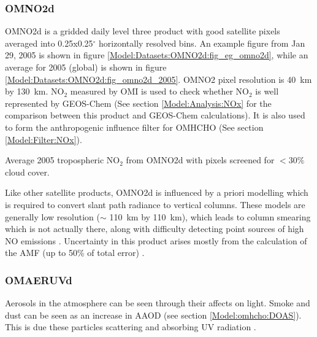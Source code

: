     \subsubsection{OMNO2d}
      \label{Model:Datasets:OMNO2d}
      OMNO2d is a gridded daily level three product with good satellite pixels averaged into 0.25x0.25$^{\circ}$ horizontally resolved bins.
      An example figure from Jan 29, 2005 is shown in figure \ref{Model:Datasets:OMNO2d:fig_eg_omno2d}, while an average for 2005 (global) is shown in figure \ref{Model:Datasets:OMNO2d:fig_omno2d_2005}.
      OMNO2 pixel resolution is 40~km by 130~km.
      NO$_2$ measured by OMI is used to check whether NO$_2$ is well represented by GEOS-Chem (See section \ref{Model:Analysis:NOx} for the comparison between this product and GEOS-Chem calculations).
      It is also used to form the anthropogenic influence filter for OMHCHO (See section \ref{Model:Filter:NOx}).
      
      
      
      {Average 2005 tropospheric NO$_2$ from OMNO2d with pixels screened for $<30\%$ cloud cover.}
      {\label{Model:Datasets:OMNO2d:fig_omno2d_2005}}
      
      Like other satellite products, OMNO2d is influenced by a priori modelling which is required to convert slant path radiance to vertical columns.
      These models are generally low resolution ($\sim$ 110~km by 110~km), which leads to column smearing which is not actually there, along with difficulty detecting point sources of high NO emissions \parencite{Goldberg2018}.
      Uncertainty in this product arises mostly from the calculation of the AMF (up to 50\% of total error) \parencite{Lorente2017}.
    
    \subsubsection{OMAERUVd}
      \label{Model:Datasets:OMAERUVd}
      
      Aerosols in the atmosphere can be seen through their affects on light. 
      Smoke and dust can be seen as an increase in AAOD (see section \ref{Model:omhcho:DOAS}).
      This is due these particles scattering and absorbing UV radiation \parencite{Ahn2008}.
      
